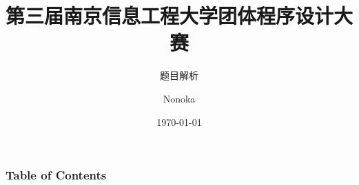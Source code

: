 \documentclass[UTF8]{ctexbeamer}
\title{第三届南京信息工程大学团体程序设计大赛}
\subtitle{题目解析}
\author{Nonoka}
\institute{ThinkSpirit}
\date{\today}
\begin{document}
\frame{\titlepage}
\begin{frame}
    \frametitle{Table of Contents}
    \begin{multicols}{2}
    \tableofcontents
    \end{multicols}
\end{frame}







\end{document}
